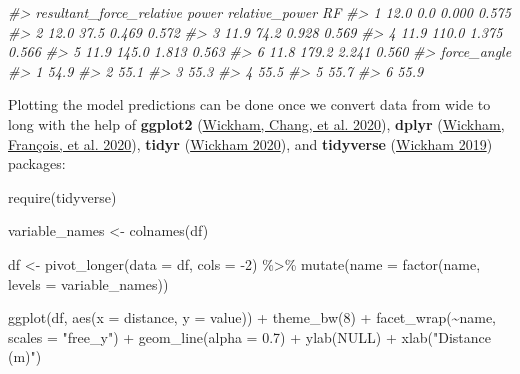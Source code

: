 \documentclass[fleqn,10pt,lineno]{wlpeerj} %
\newenvironment{Shaded}{\begin{snugshade}}{\end{snugshade}}
\newcommand{\AttributeTok}[1]{\textcolor[rgb]{0.77,0.63,0.00}{#1}}
\newcommand{\CommentTok}[1]{\textcolor[rgb]{0.56,0.35,0.01}{\textit{#1}}}
\newcommand{\ConstantTok}[1]{\textcolor[rgb]{0.00,0.00,0.00}{#1}}
\newcommand{\DecValTok}[1]{\textcolor[rgb]{0.00,0.00,0.81}{#1}}
\newcommand{\FloatTok}[1]{\textcolor[rgb]{0.00,0.00,0.81}{#1}}
\newcommand{\FunctionTok}[1]{\textcolor[rgb]{0.00,0.00,0.00}{#1}}
\newcommand{\NormalTok}[1]{#1}
\newcommand{\OtherTok}[1]{\textcolor[rgb]{0.56,0.35,0.01}{#1}}
\newcommand{\SpecialCharTok}[1]{\textcolor[rgb]{0.00,0.00,0.00}{#1}}
\newcommand{\StringTok}[1]{\textcolor[rgb]{0.31,0.60,0.02}{#1}}
\begin{document}
\begin{Shaded}
\begin{Highlighting}[]
\CommentTok{\#\textgreater{}   resultant\_force\_relative power relative\_power    RF}
\CommentTok{\#\textgreater{} 1                     12.0   0.0          0.000 0.575}
\CommentTok{\#\textgreater{} 2                     12.0  37.5          0.469 0.572}
\CommentTok{\#\textgreater{} 3                     11.9  74.2          0.928 0.569}
\CommentTok{\#\textgreater{} 4                     11.9 110.0          1.375 0.566}
\CommentTok{\#\textgreater{} 5                     11.9 145.0          1.813 0.563}
\CommentTok{\#\textgreater{} 6                     11.8 179.2          2.241 0.560}
\CommentTok{\#\textgreater{}   force\_angle}
\CommentTok{\#\textgreater{} 1        54.9}
\CommentTok{\#\textgreater{} 2        55.1}
\CommentTok{\#\textgreater{} 3        55.3}
\CommentTok{\#\textgreater{} 4        55.5}
\CommentTok{\#\textgreater{} 5        55.7}
\CommentTok{\#\textgreater{} 6        55.9}
\end{Highlighting}
\end{Shaded}

Plotting the model predictions can be done once we convert data from wide to long with the help of \textbf{ggplot2} (\protect\hyperlink{ref-R-ggplot2}{Wickham, Chang, et al. 2020}), \textbf{dplyr} (\protect\hyperlink{ref-R-dplyr}{Wickham, François, et al. 2020}), \textbf{tidyr} (\protect\hyperlink{ref-R-tidyr}{Wickham 2020}), and \textbf{tidyverse} (\protect\hyperlink{ref-R-tidyverse}{Wickham 2019}) packages:

\begin{Shaded}
\begin{Highlighting}[]
\FunctionTok{require}\NormalTok{(tidyverse)}

\NormalTok{variable\_names }\OtherTok{\textless{}{-}} \FunctionTok{colnames}\NormalTok{(df)}

\NormalTok{df }\OtherTok{\textless{}{-}} \FunctionTok{pivot\_longer}\NormalTok{(}\AttributeTok{data =}\NormalTok{ df, }\AttributeTok{cols =} \SpecialCharTok{{-}}\DecValTok{2}\NormalTok{) }\SpecialCharTok{\%\textgreater{}\%}
  \FunctionTok{mutate}\NormalTok{(}\AttributeTok{name =} \FunctionTok{factor}\NormalTok{(name, }\AttributeTok{levels =}\NormalTok{ variable\_names))}

\FunctionTok{ggplot}\NormalTok{(df, }\FunctionTok{aes}\NormalTok{(}\AttributeTok{x =}\NormalTok{ distance, }\AttributeTok{y =}\NormalTok{ value)) }\SpecialCharTok{+}
  \FunctionTok{theme\_bw}\NormalTok{(}\DecValTok{8}\NormalTok{) }\SpecialCharTok{+}
  \FunctionTok{facet\_wrap}\NormalTok{(}\SpecialCharTok{\textasciitilde{}}\NormalTok{name, }\AttributeTok{scales =} \StringTok{"free\_y"}\NormalTok{) }\SpecialCharTok{+}
  \FunctionTok{geom\_line}\NormalTok{(}\AttributeTok{alpha =} \FloatTok{0.7}\NormalTok{) }\SpecialCharTok{+}
  \FunctionTok{ylab}\NormalTok{(}\ConstantTok{NULL}\NormalTok{) }\SpecialCharTok{+}
  \FunctionTok{xlab}\NormalTok{(}\StringTok{"Distance (m)"}\NormalTok{)}
\end{Highlighting}
\end{Shaded}
\end{document}
